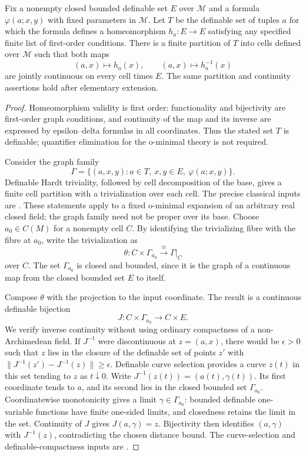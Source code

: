 \begin{lemma}\label{lem:coefficient-cells-joint-evaluation}
Fix a nonempty closed bounded definable set $E$ over $\mathcal M$
and a formula $\varphi(a;x,y)$ with fixed parameters in
$\mathcal M$.  Let $T$ be the definable set of tuples $a$ for which
the formula defines a homeomorphism $h_a:E\to E$ satisfying any
specified finite list of first-order conditions.  There is a finite
partition of $T$ into cells defined over $\mathcal M$ such that
both maps
\[
 (a,x)\longmapsto h_a(x),\qquad
 (a,x)\longmapsto h_a^{-1}(x)
\]
are jointly continuous on every cell times $E$.  The same partition
and continuity assertions hold after elementary extension.
\end{lemma}

\begin{proof}
Homeomorphism validity is first order: functionality and bijectivity
are first-order graph conditions, and continuity of the map and its
inverse are expressed by epsilon--delta formulas in all coordinates.
Thus the stated set $T$ is definable; quantifier elimination for the
o-minimal theory is not required.

Consider the graph family
\[
 \Gamma=\{(a,x,y):a\in T,\ x,y\in E,\ \varphi(a;x,y)\}.
\]
Definable Hardt triviality, followed by cell decomposition of the
base, gives a finite cell partition with a trivialization over each
cell.  The precise classical inputs are
\cite[Theorem~5.22, pp.~62--63; Theorem~2.10, p.~19]{Coste1999}.
These statements apply to a fixed o-minimal expansion of an arbitrary
real closed field; the graph family need not be proper over its base.
Choose $a_0\in C(M)$ for a nonempty cell $C$.  By identifying the
trivializing fibre with the fibre at $a_0$, write the trivialization as
\[
 \theta:C\times\Gamma_{a_0}\xrightarrow{\ \cong\ }\Gamma|_C
\]
over $C$.  The set $\Gamma_{a_0}$ is closed and bounded, since it is
the graph of a continuous map from the closed bounded set $E$ to itself.

Compose $\theta$ with the projection to the input coordinate.  The
result is a continuous definable bijection
\[
 J:C\times\Gamma_{a_0}\longrightarrow C\times E.
\]
We verify inverse continuity without using ordinary compactness of
a non-Archimedean field.  If $J^{-1}$ were discontinuous at
$z=(a,x)$, there would be $\epsilon>0$ such that $z$ lies in the
closure of the definable set of points $z'$ with
$\|J^{-1}(z')-J^{-1}(z)\|\geq\epsilon$.
Definable curve selection provides a curve $z(t)$ in this set tending
to $z$ as $t\downarrow0$.  Write
$J^{-1}(z(t))=(a(t),\gamma(t))$.  Its first coordinate tends to $a$,
and its second lies in the closed bounded set $\Gamma_{a_0}$.
Coordinatewise monotonicity gives a limit
$\gamma\in\Gamma_{a_0}$: bounded definable one-variable functions
have finite one-sided limits, and closedness retains the limit in
the set.  Continuity of $J$ gives $J(a,\gamma)=z$.  Bijectivity
then identifies $(a,\gamma)$ with $J^{-1}(z)$, contradicting the
chosen distance bound.  The curve-selection and definable-compactness
inputs are \cite[Theorems~3.2 and~3.4, pp.~26--27]{Coste1999}.


\end{proof}
